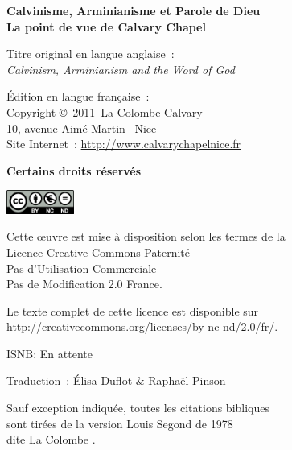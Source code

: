 \newpage
\mbox{}
\vfill

{\scriptsize

{\bfseries Calvinisme, Arminianisme et Parole de Dieu\\
La point de vue de Calvary Chapel}

Titre original en langue anglaise~:\\
\emph{Calvinism, Arminianism and the Word of God}

Édition en langue française~:\\
Copyright \copyright{}~2011~La Colombe Calvary\\
 10, avenue Aimé Martin ~Nice\\
Site Internet~: \url{http://www.calvarychapelnice.fr}

{\bfseries Certains droits réservés}

\includegraphics[width=6em]{by-nc-nd_eu}

Cette \oe{}uvre est mise à disposition selon les termes de la \\
 Licence Creative Commons Paternité \\
 \ocadr Pas d'Utilisation Commerciale \\
 \ocadr Pas de Modification 2.0 France.

Le texte complet de cette licence est disponible sur \\
 \url{http://creativecommons.org/licenses/by-nc-nd/2.0/fr/}.

ISNB: En attente

Traduction~: Élisa Duflot \& Raphaël Pinson

Sauf exception indiquée, toutes les citations bibliques \\
 sont tirées de la version Louis Segond de 1978 \\ dite \og La Colombe \fg{}.

}
